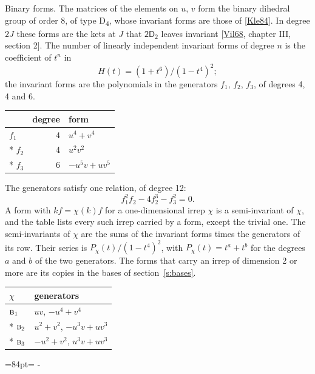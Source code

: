 \documentclass[10pt,a4paper]{article}
\makeatletter
\renewcommand\paragraph{\@startsection{paragraph}{4}{\z@}{1.5ex plus .5ex minus .2ex}{-1em}%
  {\normalfont\small\sffamily\bfseries\color{parttitle}}}
\newcommand{\needspace}[1]{\par\penalty-100\begingroup\dimen0=#1\relax\dimen2=\pagegoal
  \advance\dimen2-\pagetotal\ifdim\dimen0>\dimen2\relax\ifdim\dimen2>0pt\vfil\break\fi\fi
  \endgroup}
\numberwithin{equation}{section}
\newcommand{\grp}[1]{\mathsf{#1}}
\newcommand{\irr}[1]{\text{\normalfont\scshape #1}}
\makeatother
\begin{document}
\paragraph{Binary forms.}
The matrices of the elements on $u$, $v$ form the binary dihedral group of order 8, of type D\textsubscript{4}, whose invariant forms are those of [\href{../../../REFERENCES.pdf\#ref.Kle84}{Kle84}]. In degree $2J$ these forms are the kets at $J$ that $\grp{2D_{2}}$ leaves invariant [\href{../../../REFERENCES.pdf\#ref.Vil68}{Vil68}, chapter III, section 2]. \label{n:head.degree}\label{n:head.form}The number of linearly independent invariant forms of degree $n$ is the coefficient of $t^n$ in
\begin{equation}\label{e:molien}H(t) = (1 + t^{6})/(1-t^{4})^{2};\end{equation}
the invariant forms are the polynomials in the generators $f_1$, $f_2$, $f_3$, of degrees 4, 4 and 6.
{\small\begin{longtable}{@{}lrl@{}}\toprule
& degree & form\\\midrule\endhead
\bottomrule\endfoot\endlastfoot
$f_{1}$ & 4 & $u^{4} + v^{4}$\\*
$f_{2}$ & 4 & $u^{2}v^{2}$\\*
$f_{3}$ & 6 & $-u^{5}v + uv^{5}$\\
\bottomrule\end{longtable}}
The generators satisfy one relation, of degree 12:
\begin{equation}\label{e:relation}f_{1}^{2}f_{2} - 4f_{2}^{3} - f_{3}^{2} = 0.\end{equation}
A form with $k f = \chi(k) f$ for a one-dimensional irrep $\chi$ is a semi-invariant of $\chi$, and the table lists every such irrep carried by a form, except the trivial one. \label{n:head.generators}The semi-invariants of $\chi$ are the sums of the invariant forms times the generators of its row. Their series is $P_\chi(t)/(1-t^{4})^{2}$, with $P_\chi(t) = t^{a} + t^{b}$ for the degrees $a$ and $b$ of the two generators. The forms that carry an irrep of dimension 2 or more are its copies in the bases of section~\ref{s:bases}.
{\small\begin{longtable}{@{}ll@{}}\toprule
$\chi$ & generators\\\midrule\endhead
\bottomrule\endfoot\endlastfoot
$\irr{b}_{1}$ & $uv$, $-u^{4} + v^{4}$\\*
$\irr{b}_{2}$ & $u^{2} + v^{2}$, $-u^{3}v + uv^{3}$\\*
$\irr{b}_{3}$ & $-u^{2} + v^{2}$, $u^{3}v + uv^{3}$\\
\bottomrule\end{longtable}}
\needspace{84pt}
\end{document}
